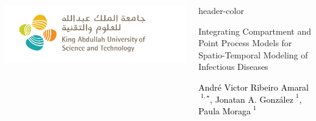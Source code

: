 \documentclass[12pt]{beamer}
\begin{document}
	\begin{frame}[t]
		\vspace{-46pt}
		\begin{columns}[t]
			\begin{column}{1\textwidth} \justifying %
				\begin{block}

					\begin{columns}[T]
						\begin{column}{0.2\textwidth}
							\includegraphics[width=1.15\linewidth]{Images/KAUST_logo} 
						\end{column}
						\begin{column}{0.67\textwidth}
							\vspace{32pt}
							\begin{beamercolorbox}[wd=1.00\textwidth]{header-color}	
								{\Large \textcolor{strong-blue}{{Integrating Compartment and Point Process Models for Spatio-Temporal Modeling of Infectious Diseases}} \par} \vspace{12pt}
								
								{\normalsize \textcolor{black}{
									André Victor Ribeiro Amaral${\phantom{|}}^{1, \star}$, 
									Jonatan A. González${\phantom{|}}^{1}$,
									Paula Moraga${\phantom{|}}^{1}$
								}}	\vspace{16pt}
								

\end{beamercolorbox}
\end{column}
\end{columns}
\end{block}
\end{column}
\end{columns}
\end{frame}
\end{document}
